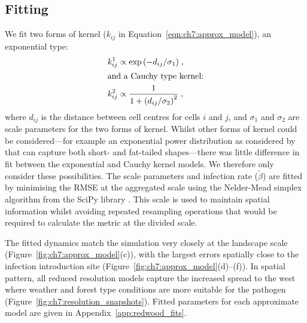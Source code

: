 \subsection{Fitting}

We fit two forms of kernel ($k_{ij}$ in Equation~\ref{eqn:ch7:approx_model}), an exponential type:
\begin{align}
    k_{ij}^1 &\propto \exp{\left(-d_{ij}/\sigma_1\right)}\;, \\
\intertext{and a Cauchy type kernel:}
    k_{ij}^2 &\propto \frac{1}{1+\left(d_{ij}/\sigma_2\right)^2}\;,
\end{align}
where $d_{ij}$ is the distance between cell centres for cells $i$ and $j$, and $\sigma_1$ and $\sigma_2$ are scale parameters for the two forms of kernel. Whilst other forms of kernel could be considered---for example an exponential power distribution as considered by \citet{skelsey_pest_2013} that can capture both short- and fat-tailed shapes---there was little difference in fit between the exponential and Cauchy kernel models. We therefore only consider these possibilities. The scale parameters and infection rate ($\tilde{\beta}$) are fitted by minimising the RMSE at the aggregated scale using the Nelder-Mead simplex algorithm \citep{gao_implementing_2012} from the SciPy library \citep{scipy}. This scale is used to maintain spatial information whilst avoiding repeated resampling operations that would be required to calculate the metric at the divided scale.

The fitted dynamics match the simulation very closely at the landscape scale (Figure~\ref{fig:ch7:approx_model}(c)), with the largest errors spatially close to the infection introduction site (Figure~\ref{fig:ch7:approx_model}(d)--(f)). In spatial pattern, all reduced resolution models capture the increased spread to the west where weather and forest type conditions are more suitable for the pathogen (Figure~\ref{fig:ch7:resolution_snapshots}). Fitted parameters for each approximate model are given in Appendix~\ref{app:redwood_fits}.

